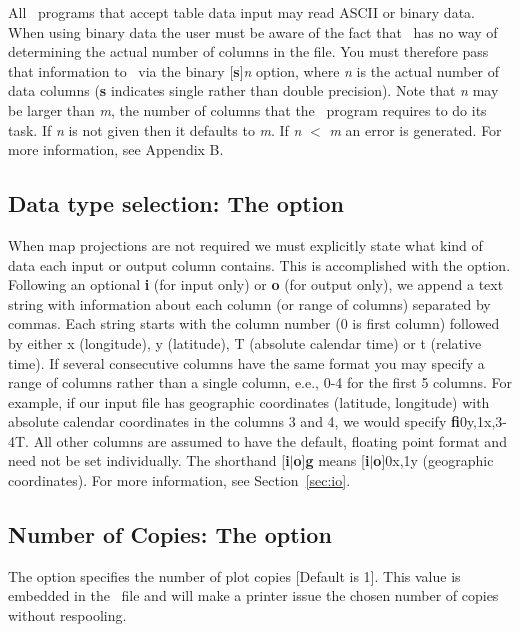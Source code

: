 All \GMT\ programs that accept table data input may read ASCII
or binary data.  When using binary data the user must be aware
of the fact that \GMT\ has no way of determining the actual
number of columns in the file.  You must therefore pass that
information to \GMT\ via the binary [{\bf s}]{\it n} option,
where {\it n} is the actual number of data columns ({\bf s}
indicates single rather than double precision).
Note that {\it n} may be larger than {\it m}, the number of
columns that the \GMT\ program requires to do its task.  If
{\it n} is not given then it defaults to {\it m}.  If
{\it n} $<$ {\it m} an error is generated.  For more information,
see Appendix B.

\subsection{Data type selection: The  option}

When map projections are not required we must explicitly state
what kind of data each input or output column contains.  This is accomplished with
the  option.  Following an optional {\bf i} (for input only) or {\bf o} (for output
only), we append a text string with information about each column (or range of columns) separated by commas.
Each string starts with the column number (0 is first column) followed by either
x (longitude), y (latitude), T (absolute calendar time) or t (relative time).  If
several consecutive columns have the same format you may specify a range of columns
rather than a single column, e.e., 0-4 for the first 5 columns.  For example, if our
input file has geographic coordinates (latitude, longitude) with absolute calendar
coordinates in the columns 3 and 4, we would specify {\bf fi}0y,1x,3-4T.  All other columns
are assumed to have the default, floating point format and need not be set individually.
The shorthand [{\bf i}$|${\bf o}]{\bf g} means [{\bf i}$|${\bf o}]0x,1y (geographic coordinates).
For more information, see Section~\ref{sec:io}.

\subsection{Number of Copies: The  option}

The  option specifies the number of plot copies [Default is 1].  This
value is embedded in the \PS\ file and will make a printer issue the chosen
number of copies without respooling.

